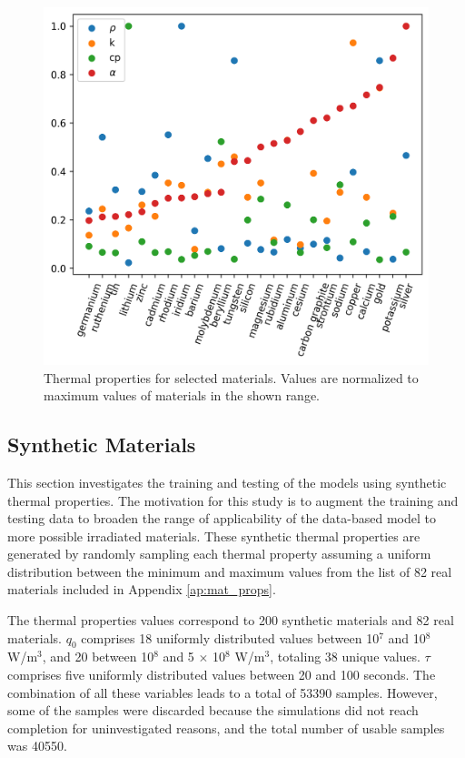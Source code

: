 \begin{figure}[htbp!] %
    \centering
    \includegraphics[width=0.65\linewidth]{figures/alpha}
    \hfill
    \caption{Thermal properties for selected materials. Values are normalized to maximum values of materials in the shown range.}
    \label{fig:pre-cnfm-alpha-2}
\end{figure}


\subsection{Synthetic Materials}
\label{sec:syn-mat}

This section investigates the training and testing of the models using synthetic thermal properties.
The motivation for this study is to augment the training and testing data to broaden the range of applicability of the data-based model to more possible irradiated materials.
These synthetic thermal properties are generated by randomly sampling each thermal property assuming a uniform distribution between the minimum and maximum values from the list of 82 real materials included in Appendix \ref{ap:mat_props}.

The thermal properties values correspond to 200 synthetic materials and 82 real materials.
$q_0$ comprises 18 uniformly distributed values between 10$^7$ and 10$^8$ W/m$^3$, and 20 between 10$^8$ and 5 $\times$ 10$^8$ W/m$^3$, totaling 38 unique values.
$\tau$ comprises five uniformly distributed values between 20 and 100 seconds.
The combination of all these variables leads to a total of 53390 samples.
However, some of the samples were discarded because the simulations did not reach completion for uninvestigated reasons, and the total number of usable samples was 40550.

